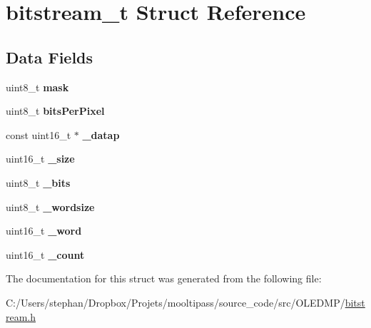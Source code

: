 \hypertarget{structbitstream__t}{\section{bitstream\-\_\-t Struct Reference}
\label{structbitstream__t}
}
\subsection*{Data Fields}
\begin{DoxyCompactItemize}
\item 
\hypertarget{structbitstream__t_a8a74907784be6c7786c2d060c8d7e10b}{uint8\-\_\-t {\bfseries mask}}\label{structbitstream__t_a8a74907784be6c7786c2d060c8d7e10b}

\item 
\hypertarget{structbitstream__t_a6a3c851ca52ea8aa201b6753a4585736}{uint8\-\_\-t {\bfseries bits\-Per\-Pixel}}\label{structbitstream__t_a6a3c851ca52ea8aa201b6753a4585736}

\item 
\hypertarget{structbitstream__t_ac6b93613aac5d1f99bb7110cd3225c50}{const uint16\-\_\-t $\ast$ {\bfseries \-\_\-datap}}\label{structbitstream__t_ac6b93613aac5d1f99bb7110cd3225c50}

\item 
\hypertarget{structbitstream__t_aa634b952549ebb0aa1c5f90330b66f76}{uint16\-\_\-t {\bfseries \-\_\-size}}\label{structbitstream__t_aa634b952549ebb0aa1c5f90330b66f76}

\item 
\hypertarget{structbitstream__t_ac7b691cab37efadfad1f6f8739dfe125}{uint8\-\_\-t {\bfseries \-\_\-bits}}\label{structbitstream__t_ac7b691cab37efadfad1f6f8739dfe125}

\item 
\hypertarget{structbitstream__t_a1247e14eec68041248d6d71040b151a2}{uint8\-\_\-t {\bfseries \-\_\-wordsize}}\label{structbitstream__t_a1247e14eec68041248d6d71040b151a2}

\item 
\hypertarget{structbitstream__t_a957c357acebf129016c23a180c55a138}{uint16\-\_\-t {\bfseries \-\_\-word}}\label{structbitstream__t_a957c357acebf129016c23a180c55a138}

\item 
\hypertarget{structbitstream__t_af818e6e9d7218107aa8fcf4e054c5a10}{uint16\-\_\-t {\bfseries \-\_\-count}}\label{structbitstream__t_af818e6e9d7218107aa8fcf4e054c5a10}

\end{DoxyCompactItemize}


The documentation for this struct was generated from the following file\-:\begin{DoxyCompactItemize}
\item 
C\-:/\-Users/stephan/\-Dropbox/\-Projets/mooltipass/source\-\_\-code/src/\-O\-L\-E\-D\-M\-P/\hyperlink{bitstream_8h}{bitstream.\-h}\end{DoxyCompactItemize}
